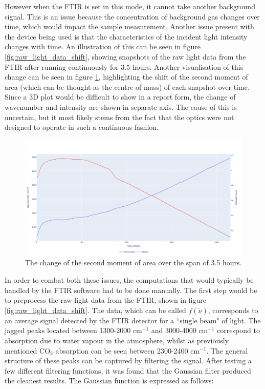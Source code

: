 However when the FTIR is set in this mode, it cannot take another background signal. This is an issue because the concentration of background gas changes over time, which would impact the sample measurement. Another issue present with the device being used is that the characteristics of the incident light intensity changes with time. An illustration of this can be seen in figure \ref{fig:raw_light_data_shift}, showing snapshots of the raw light data from the FTIR after running continuously for 3.5 hours. Another visualisation of this change can be seen in figure \ref{fig:second_moment_of_area}, highlighting the shift of the second moment of area (which can be thought as the centre of mass) of each snapshot over time. Since a 3D plot would be difficult to show in a  report form, the change of wavenumber and intensity are shown in separate axis. The cause of this is uncertain, but it most likely stems from the fact that the optics were not designed to operate in such a continuous fashion.

\begin{figure}[h!]
	\centering
	\includegraphics[width=1\linewidth]{chapter_4/figures/second_moment_of_area.png}
	\caption{The change of the second moment of area over the span of 3.5 hours.}
	\label{fig:second_moment_of_area}
\end{figure}

In order to combat both these issues, the computations that would typically be handled by the FTIR software had to be done manually. The first step would be to preprocess the raw light data from the FTIR, shown in figure \ref{fig:raw_light_data_shift}. The data, which can be called $f(\tilde{\nu})$, corresponds to an average signal detected by the FTIR detector for a ``single beam" of light. The jagged peaks located between 1300-2000 cm$^{-1}$ and 3000-4000 cm$^{-1}$ correspond to absorption due to water vapour in the atmosphere, whilst as previously mentioned CO$_2$ absorption can be seen between 2300-2400 cm$^{-1}$. The general structure of these peaks can be captured by filtering the signal. After testing a few different filtering functions, it was found that the Gaussian filter produced the cleanest results. The Gaussian function is expressed as follows:

